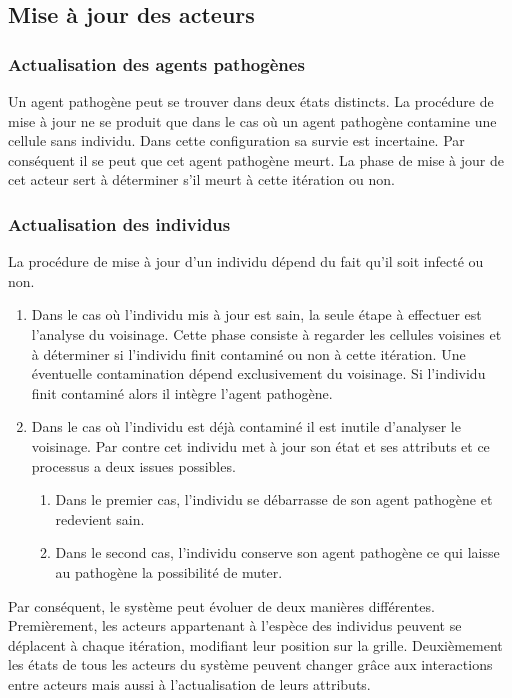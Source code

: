 \subsection{Mise à jour des acteurs}

\subsubsection{Actualisation des agents pathogènes}

Un agent pathogène peut se trouver dans deux états distincts. La procédure de mise à jour ne se produit que dans le cas où un agent pathogène contamine une cellule sans individu. Dans cette configuration sa survie est incertaine. Par conséquent il se peut que cet agent pathogène meurt. La phase de mise à jour de cet acteur sert à déterminer s'il meurt à cette itération ou non.

\subsubsection{Actualisation des individus}

La procédure de mise à jour d'un individu dépend du fait qu'il soit infecté ou non.
\begin{enumerate}
	\item Dans le cas où l'individu mis à jour est sain, la seule étape à effectuer est l'analyse du voisinage. Cette phase consiste à regarder les cellules voisines et à déterminer si l'individu finit contaminé ou non à cette itération. Une éventuelle contamination dépend exclusivement du voisinage. Si l'individu finit contaminé alors il intègre l'agent pathogène.
	\item Dans le cas où l'individu est déjà contaminé il est inutile d'analyser le voisinage. Par contre cet individu met à jour son état et ses attributs et ce processus a deux issues possibles.
	\begin{enumerate}
		\item Dans le premier cas, l'individu se débarrasse de son agent pathogène et redevient sain.
		\item Dans le second cas, l'individu conserve son agent pathogène ce qui laisse au pathogène la possibilité de muter.
	\end{enumerate} 
\end{enumerate}

Par conséquent, le système peut évoluer de deux manières différentes. Premièrement, les acteurs appartenant à l'espèce des individus peuvent se déplacent à chaque itération, modifiant leur position sur la grille. Deuxièmement les états de tous les acteurs du système peuvent changer grâce aux interactions entre acteurs mais aussi à l'actualisation de leurs attributs.\\

